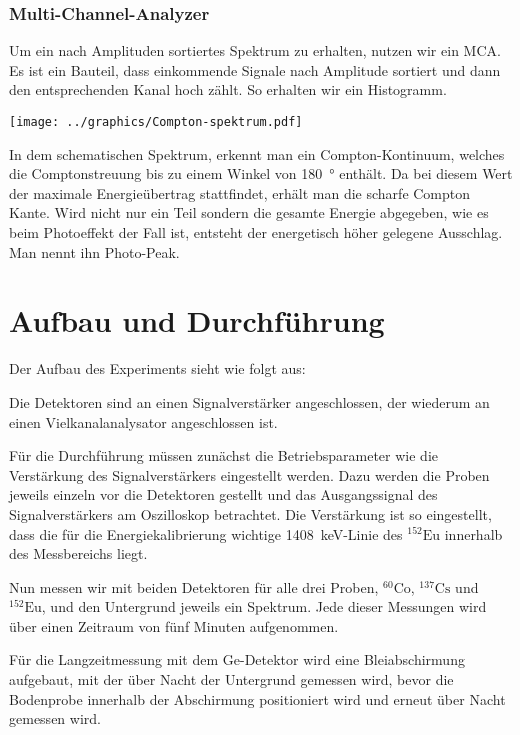 \documentclass[11pt, ngerman, fleqn, DIV=15, headinclude, BCOR=2cm]{scrreprt}
\begin{document}
\subsection{Multi-Channel-Analyzer}

Um ein nach Amplituden sortiertes Spektrum zu erhalten, nutzen wir ein MCA.
Es ist ein Bauteil, dass einkommende Signale nach Amplitude sortiert und
dann den entsprechenden Kanal hoch zählt. So erhalten wir ein
Histogramm.

\texttt{[image: ../graphics/Compton-spektrum.pdf]}
\parencite{comptoneffekt}

In dem schematischen Spektrum, erkennt man ein Compton-Kontinuum, welches die 
Comptonstreuung bis zu einem Winkel von \SI{180}{\degree} enthält. Da bei diesem
Wert der maximale Energieübertrag stattfindet, erhält man die scharfe Compton Kante.
Wird nicht nur ein Teil sondern die gesamte Energie abgegeben, wie es beim
Photoeffekt der Fall ist, entsteht der energetisch höher gelegene Ausschlag. Man 
nennt ihn Photo-Peak.

\chapter{Aufbau und Durchführung}

Der Aufbau des Experiments sieht wie folgt aus:

Die Detektoren sind an einen Signalverstärker angeschlossen, der
wiederum an einen Vielkanalanalysator angeschlossen ist.

Für die Durchführung müssen zunächst die Betriebsparameter wie die
Verstärkung des Signalverstärkers eingestellt werden.
Dazu werden die Proben jeweils einzeln vor die Detektoren gestellt und das
Ausgangssignal des Signalverstärkers am Oszilloskop betrachtet.
Die Verstärkung ist so eingestellt, dass die für die Energiekalibrierung
wichtige \SI{1408}{\kilo\electronvolt}-Linie des $^{152}\text{Eu}$
innerhalb des Messbereichs liegt.

Nun messen wir mit beiden Detektoren für alle drei Proben, $^{60}\text{Co}$,
$^{137}\text{Cs}$ und $^{152}\text{Eu}$, und den Untergrund jeweils ein
Spektrum. Jede dieser Messungen wird über einen Zeitraum von fünf Minuten aufgenommen.

Für die Langzeitmessung mit dem Ge-Detektor wird eine Bleiabschirmung
aufgebaut, mit der über Nacht der Untergrund gemessen wird, bevor die Bodenprobe
innerhalb der Abschirmung positioniert wird und erneut über Nacht gemessen wird.
\end{document}
